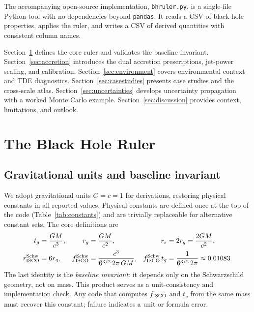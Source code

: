 \documentclass[11pt]{article}
\begin{document}
The accompanying open-source implementation, \texttt{bhruler.py}, is a single-file Python tool with no dependencies beyond \texttt{pandas}.
It reads a CSV of black hole properties, applies the ruler, and writes a CSV of derived quantities with consistent column names.

Section~\ref{sec:ruler} defines the core ruler and validates the baseline invariant.
Section~\ref{sec:accretion} introduces the dual accretion prescriptions, jet-power scaling, and calibration.
Section~\ref{sec:environment} covers environmental context and TDE diagnostics.
Section~\ref{sec:casestudies} presents case studies and the cross-scale atlas.
Section~\ref{sec:uncertainties} develops uncertainty propagation with a worked Monte Carlo example.
Section~\ref{sec:discussion} provides context, limitations, and outlook.

\section{The Black Hole Ruler}\label{sec:ruler}

\subsection{Gravitational units and baseline invariant}

We adopt gravitational units $G=c=1$ for derivations, restoring physical constants in all reported values.
Physical constants are defined once at the top of the code (Table~\ref{tab:constants}) and are trivially replaceable for alternative constant sets.
The core definitions are
\begin{align}
 t_g &= \frac{GM}{c^3}, & r_g &= \frac{GM}{c^2}, & r_s &= 2r_g = \frac{2GM}{c^2},\label{eq:scales}\\
 r_{\rm ISCO}^{\rm Schw} &= 6r_g, & f_{\rm ISCO}^{\rm Schw} &= \frac{c^3}{6^{3/2}\,2\pi\, GM}, & f_{\rm ISCO}^{\rm Schw}\,t_g &= \frac{1}{6^{3/2}\,2\pi} \approx 0.01083.\label{eq:invariant}
\end{align}
The last identity is the \emph{baseline invariant}: it depends only on the Schwarzschild geometry, not on mass.
This product serves as a unit-consistency and implementation check.
Any code that computes $f_{\rm ISCO}$ and $t_g$ from the same mass must recover this constant; failure indicates a unit or formula error.
\end{document}
